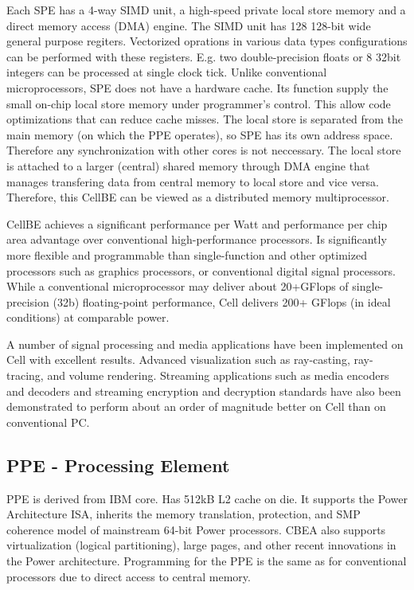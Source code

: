 Each SPE has a 4-way SIMD unit, a high-speed private local store memory and a direct memory access (DMA) engine.
The SIMD unit has 128 128-bit wide general purpose regiters.
Vectorized oprations in various data types configurations can be performed with these registers.
E.g. two double-precision floats or 8 32bit integers can be processed at single clock tick.
Unlike conventional microprocessors, SPE does not have a hardware cache.
Its function supply the small on-chip local store memory under programmer's control.
This allow code optimizations that can reduce cache misses.
The local store is separated from the main memory (on which the PPE operates), so SPE has its own address space.
Therefore any synchronization with other cores is not neccessary.
The local store is attached to a larger (central) shared memory through DMA engine that
manages transfering data from central memory to local store and vice versa.
Therefore, this CellBE can be viewed as a distributed memory multiprocessor.

CellBE achieves a significant performance per Watt and performance per chip area advantage over conventional high-performance processors.
Is significantly more flexible and programmable than single-function and other optimized processors such as graphics processors, or conventional digital signal processors.
While a conventional microprocessor may deliver about 20+GFlops of single-precision (32b) floating-point performance, Cell delivers 200+ GFlops (in ideal conditions) at comparable power.

A number of signal processing and media applications have been implemented on Cell with excellent results.
Advanced visualization such as ray-casting, ray-tracing, and volume rendering.
Streaming applications such as media encoders and decoders and streaming encryption and decryption standards have also been demonstrated to perform about an order of magnitude better on Cell than on conventional PC.

\subsection{PPE -  Processing Element}
PPE is derived from IBM  core. Has 512kB L2 cache on die.
It supports the Power Architecture ISA, inherits the memory translation, protection, and SMP coherence model of mainstream 64-bit Power processors.
CBEA also supports virtualization (logical partitioning), large pages, and other recent innovations in the Power architecture.
Programming for the PPE is the same as for conventional processors due to direct access to central memory.


